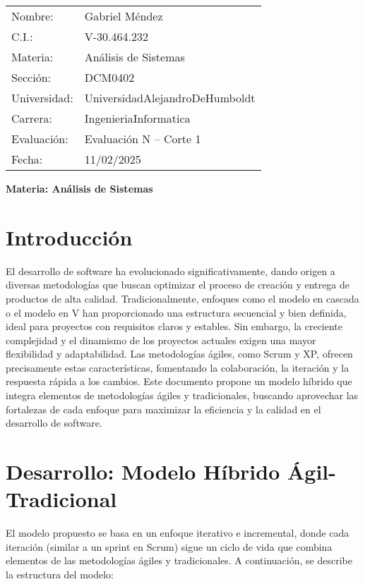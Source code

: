 \documentclass[12pt, spanish]{article}
\begin{document}
\begin{tabular}{ll}
Nombre: & Gabriel Méndez \\
C.I.: & V-30.464.232 \\
Materia: & Análisis de Sistemas \\
Sección: & DCM0402 \\
Universidad: & UniversidadAlejandroDeHumboldt \\
Carrera: & IngenieriaInformatica \\
Evaluación: & Evaluación N\textdegree1 – Corte 1 \\
Fecha: & 11/02/2025
\end{tabular}

\vspace{2cm}
\begin{center}
\Large \textbf{{Materia: Análisis de Sistemas}}
\end{center}

\section*{Introducción}

El desarrollo de software ha evolucionado significativamente, dando origen a diversas metodologías que buscan optimizar el proceso de creación y entrega de productos de alta calidad.  Tradicionalmente, enfoques como el modelo en cascada o el modelo en V han proporcionado una estructura secuencial y bien definida, ideal para proyectos con requisitos claros y estables.  Sin embargo, la creciente complejidad y el dinamismo de los proyectos actuales exigen una mayor flexibilidad y adaptabilidad. Las metodologías ágiles, como Scrum y XP, ofrecen precisamente estas características, fomentando la colaboración, la iteración y la respuesta rápida a los cambios.  Este documento propone un modelo híbrido que integra elementos de metodologías ágiles y tradicionales, buscando aprovechar las fortalezas de cada enfoque para maximizar la eficiencia y la calidad en el desarrollo de software.

\section*{Desarrollo: Modelo Híbrido Ágil-Tradicional}

El modelo propuesto se basa en un enfoque iterativo e incremental, donde cada iteración (similar a un sprint en Scrum) sigue un ciclo de vida que combina elementos de las metodologías ágiles y tradicionales. A continuación, se describe la estructura del modelo:
\end{document}

